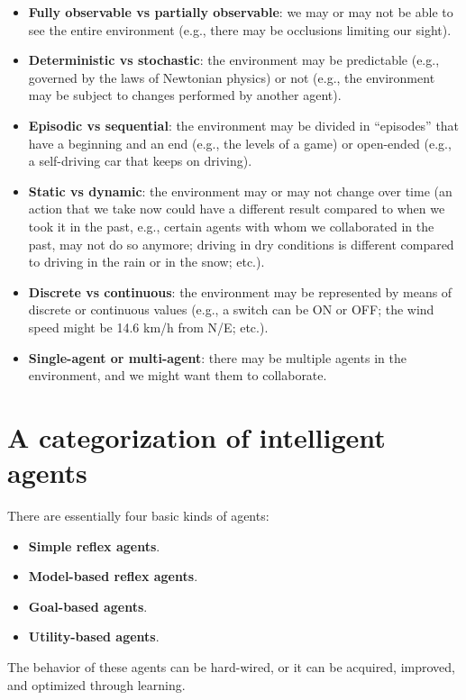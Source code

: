 \begin{itemize}
    \item \textbf{Fully observable vs partially observable}: we may or may not be able to see the entire environment (e.g., there may be occlusions limiting our sight).
    \item \textbf{Deterministic vs stochastic}: the environment may be predictable (e.g., governed by the laws of Newtonian physics) or not (e.g., the environment may be subject to changes performed by another agent).
    \item \textbf{Episodic vs sequential}: the environment may be divided in “episodes” that have a beginning and an end (e.g., the levels of a game) or open-ended (e.g., a self-driving car that keeps on driving).
    \item \textbf{Static vs dynamic}: the environment may or may not change over time (an action that we take now could have a different result compared to when we took it in the past, e.g., certain agents with whom we collaborated in the past, may not do so anymore; driving in dry conditions is different compared to driving in the rain or in the snow; etc.).
    \item \textbf{Discrete vs continuous}: the environment may be represented by means of discrete or continuous values (e.g., a switch can be ON or OFF; the wind speed might be 14.6 km/h from N/E; etc.).
    \item \textbf{Single-agent or multi-agent}: there may be multiple agents in the environment, and we might want them to collaborate.
\end{itemize}

\section{A categorization of intelligent agents}
There are essentially four basic kinds of agents:

\begin{itemize}
    \item \textbf{Simple reflex agents}.
    \item \textbf{Model-based reflex agents}.
    \item \textbf{Goal-based agents}.
    \item \textbf{Utility-based agents}.
\end{itemize}

The behavior of these agents can be hard-wired, or it can be acquired, improved, and optimized through learning.

